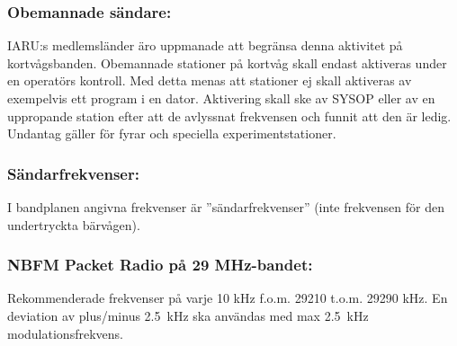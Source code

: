 \subsubsection{Obemannade sändare:}

IARU:s medlemsländer äro uppmanade att begränsa
denna aktivitet på kortvågsbanden.
Obemannade stationer på kortvåg skall endast aktiveras under en operatörs kontroll.
Med detta menas att stationer ej skall aktiveras av
exempelvis ett program i en dator. Aktivering skall ske
av SYSOP eller av en uppropande station efter att de
avlyssnat frekvensen och funnit att den är ledig.
Undantag gäller för fyrar och speciella experimentstationer.

\subsubsection{Sändarfrekvenser:}

I bandplanen angivna frekvenser är ''sändarfrekvenser''
(inte frekvensen för den undertryckta bärvågen).

\subsubsection{NBFM Packet Radio på 29 MHz-bandet:}

Rekommenderade frekvenser på varje 10 kHz f.o.m.
29210 t.o.m. 29290 kHz.
En deviation av plus/minus 2.5~kHz ska användas med
max 2.5~kHz modulationsfrekvens.

